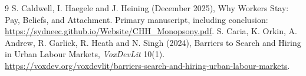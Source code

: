 \documentclass[11pt]{article}
\begin{document}
\begin{thebibliography}{9}
 S. Caldwell, I. Haegele and J. Heining (December 2025), Why Workers Stay: Pay, Beliefs, and Attachment. Primary manuscript, including conclusion:
\url{https://sydneec.github.io/Website/CHH_Monopsony.pdf}.
 S. Caria, K. Orkin, A. Andrew, R. Garlick, R. Heath and N. Singh (2024), Barriers to Search and Hiring in Urban Labour Markets, \emph{VoxDevLit} 10(1).
\url{https://voxdev.org/voxdevlit/barriers-search-and-hiring-urban-labour-markets}.
\end{thebibliography}
\end{document}
